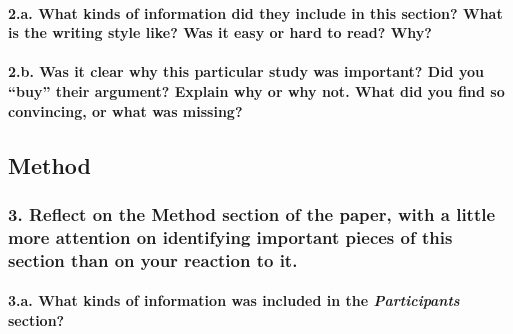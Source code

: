 \documentclass[]{article}
\let\oldparagraph\paragraph
\renewcommand{\paragraph}[1]{\oldparagraph{#1}\mbox{}}
\begin{document}
\hypertarget{a.-what-kinds-of-information-did-they-include-in-this-section-what-is-the-writing-style-like-was-it-easy-or-hard-to-read-why}{%
\paragraph{2.a. What kinds of information did they include in this
section? What is the writing style like? Was it easy or hard to read?
Why?}\label{a.-what-kinds-of-information-did-they-include-in-this-section-what-is-the-writing-style-like-was-it-easy-or-hard-to-read-why}}

\hypertarget{b.-was-it-clear-why-this-particular-study-was-important-did-you-buy-their-argument-explain-why-or-why-not.-what-did-you-find-so-convincing-or-what-was-missing}{%
\paragraph{2.b. Was it clear why this particular study was important?
Did you ``buy'' their argument? Explain why or why not. What did you
find so convincing, or what was
missing?}\label{b.-was-it-clear-why-this-particular-study-was-important-did-you-buy-their-argument-explain-why-or-why-not.-what-did-you-find-so-convincing-or-what-was-missing}}

\hypertarget{method}{%
\subsection{Method}\label{method}}

\hypertarget{reflect-on-the-method-section-of-the-paper-with-a-little-more-attention-on-identifying-important-pieces-of-this-section-than-on-your-reaction-to-it.}{%
\subsubsection{\texorpdfstring{3. Reflect on the \textbf{Method} section
of the paper, with a little more attention on identifying important
pieces of this section than on your reaction to
it.}{3. Reflect on the Method section of the paper, with a little more attention on identifying important pieces of this section than on your reaction to it.}}\label{reflect-on-the-method-section-of-the-paper-with-a-little-more-attention-on-identifying-important-pieces-of-this-section-than-on-your-reaction-to-it.}}

\hypertarget{a.-what-kinds-of-information-was-included-in-the-participants-section}{%
\paragraph{\texorpdfstring{3.a. What kinds of information was included
in the \emph{Participants}
section?}{3.a. What kinds of information was included in the Participants section?}}\label{a.-what-kinds-of-information-was-included-in-the-participants-section}}
\end{document}
